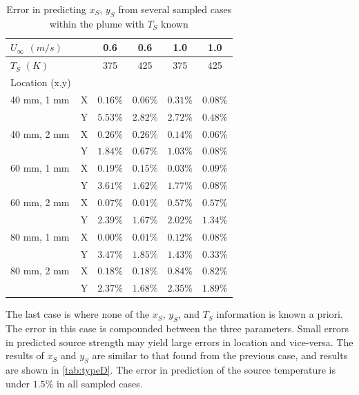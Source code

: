 \documentclass[preprint,12pt]{elsarticle}
\begin{document}
\begin{table}[!h!t!b!p]
\begin{center}
\begin{tabular}{ l | l c c c c}
 $U_{\infty}$ $(m/s)$ & & 0.6 & 0.6 & 1.0 & 1.0 \\ \hline
 $T_S$ $(K)$ & & 375 & 425 & 375 & 425  \\ \hline \hline
 Location (x,y) & \\
 40 mm, 1 mm & X & $0.16\%$ & $0.06\%$ & $0.31\%$ & $0.08\%$ \\
 						 & Y & $5.53\%$ & $2.82\%$ & $2.72\%$ & $0.48\%$ \\ \hline
 40 mm, 2 mm & X & $0.26\%$ & $0.26\%$ & $0.14\%$ & $0.06\%$ \\ 
 						 & Y & $1.84\%$ & $0.67\%$ & $1.03\%$ & $0.08\%$ \\ \hline
 60 mm, 1 mm & X & $0.19\%$ & $0.15\%$ & $0.03\%$ & $0.09\%$ \\ 
						 & Y & $3.61\%$ & $1.62\%$ & $1.77\%$ & $0.08\%$ \\ \hline
 60 mm, 2 mm & X & $0.07\%$ & $0.01\%$ & $0.57\%$ & $0.57\%$ \\ 
   					 & Y & $2.39\%$ & $1.67\%$ & $2.02\%$ & $1.34\%$ \\ \hline
 80 mm, 1 mm & X & $0.00\%$ & $0.01\%$ & $0.12\%$ & $0.08\%$ \\ 
  					 & Y & $3.47\%$ & $1.85\%$ & $1.43\%$ & $0.33\%$ \\ \hline
 80 mm, 2 mm & X & $0.18\%$ & $0.18\%$ & $0.84\%$ & $0.82\%$ \\ 
 						 & Y & $2.37\%$ & $1.68\%$ & $2.35\%$ & $1.89\%$ \\ \hline
 \end{tabular}
\caption{Error in predicting $x_S$, $y_S$ from several sampled cases within the plume with $T_S$ known}
\label{tab:typeC}
\end{center}
\end{table}


The last case is where none of the $x_S$, $y_S$, and $T_S$ information is known a priori.  The error in this case is compounded between the three parameters.  Small errors in predicted source strength may yield large errors in location and vice-versa.  The results of $x_S$ and $y_S$ are similar to that found from the previous case, and results are shown in \cref{tab:typeD}.  The error in prediction of the source temperature is under $1.5\%$ in all sampled cases.
\end{document}
